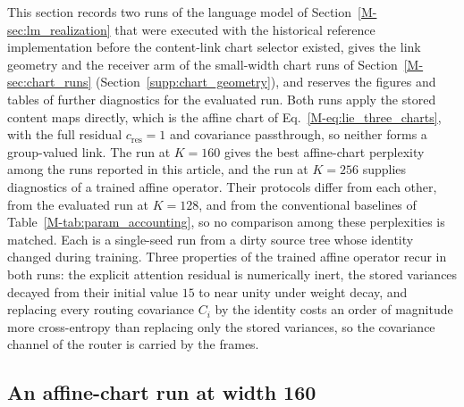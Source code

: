 \documentclass[twoside,11pt]{article}
\begin{document}
This section records two runs of the language model of Section~\ref{M-sec:lm_realization} that were executed with the historical reference implementation before the content-link chart selector existed, gives the link geometry and the receiver arm of the small-width chart runs of Section~\ref{M-sec:chart_runs} (Section~\ref{supp:chart_geometry}), and reserves the figures and tables of further diagnostics for the evaluated run. Both runs apply the stored content maps directly, which is the affine chart of Eq.~\eqref{M-eq:lie_three_charts}, with the full residual $c_{\mathrm{res}}=1$ and covariance passthrough, so neither forms a group-valued link. The run at $K=160$ gives the best affine-chart perplexity among the runs reported in this article, and the run at $K=256$ supplies diagnostics of a trained affine operator. Their protocols differ from each other, from the evaluated run at $K=128$, and from the conventional baselines of Table~\ref{M-tab:param_accounting}, so no comparison among these perplexities is matched. Each is a single-seed run from a dirty source tree whose identity changed during training. Three properties of the trained affine operator recur in both runs: the explicit attention residual is numerically inert, the stored variances decayed from their initial value $15$ to near unity under weight decay, and replacing every routing covariance $C_i$ by the identity costs an order of magnitude more cross-entropy than replacing only the stored variances, so the covariance channel of the router is carried by the frames.

\subsection{An affine-chart run at width 160}
\label{supp:run_k160}
\end{document}
